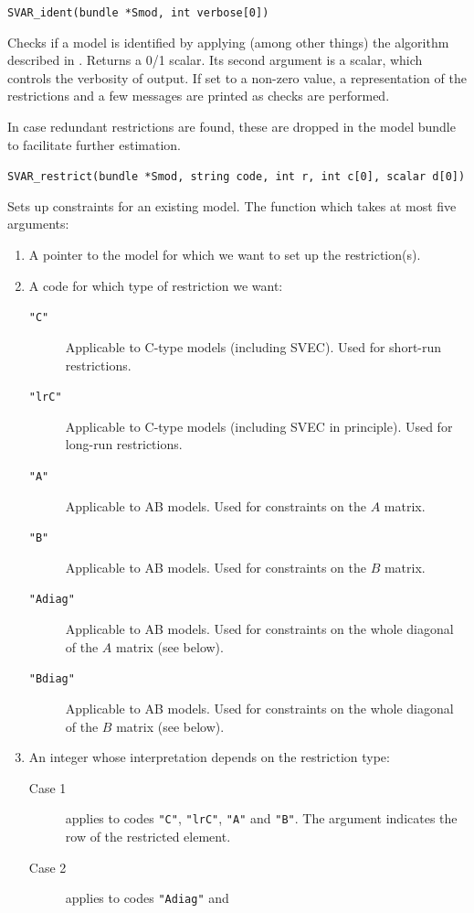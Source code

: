 \documentclass[a4paper,10pt]{article}
\newenvironment{funcdoc}[1]
{\noindent\hrulefill\newline\nopagebreak\texttt{#1}%
\nopagebreak\par\noindent\hrulefill%
\nopagebreak\par\nopagebreak\smallskip\nopagebreak\par}
{\bigskip}
\newcounter{script}[section]
\begin{document}
\begin{funcdoc}{SVAR\_ident(bundle *Smod, int verbose[0])}
  Checks if a model is identified by applying (among other things) 
  the algorithm described in \cite{AG}. Returns a 0/1 scalar. 
  Its second argument is a scalar, which controls the verbosity of output. 
  If set to a non-zero value, a representation of the restrictions and
  a few messages are printed as checks are performed.
  
  In case redundant restrictions are found, these are dropped in the 
  model bundle to facilitate further estimation.
\end{funcdoc}

\begin{funcdoc}{SVAR\_restrict(bundle *Smod, string code, int r, int c[0], scalar d[0])}
Sets up constraints for an existing model. The function which takes at
most five arguments:
\begin{enumerate}
\item A pointer to the model for which we want to set up the
  restriction(s).
\item A code for which type of restriction we want: 
  \begin{description}
  \item[\texttt{"C"}] Applicable to C-type models (including SVEC). Used for short-run
    restrictions.
  \item[\texttt{"lrC"}] Applicable to C-type models (including SVEC in principle). 
    Used for long-run restrictions.
  \item[\texttt{"A"}] Applicable to AB models. Used for constraints on
    the $A$ matrix.
  \item[\texttt{"B"}] Applicable to AB models. Used for constraints on
    the $B$ matrix.
  \item[\texttt{"Adiag"}] Applicable to AB models. Used for constraints on
    the whole diagonal of the $A$ matrix (see below).
  \item[\texttt{"Bdiag"}] Applicable to AB models. Used for constraints on
    the whole diagonal of the $B$ matrix (see below).
  \end{description}
\item An integer whose interpretation depends on the restriction type:
  \begin{description}
  \item[Case 1] applies to codes \texttt{"C"}, \texttt{"lrC"},
    \texttt{"A"} and \texttt{"B"}. The argument indicates the row of
    the restricted element.
  \item[Case 2] applies to codes \texttt{"Adiag"} and

\end{description}
\end{enumerate}
\end{funcdoc}
\end{document}
